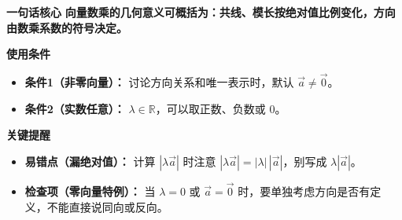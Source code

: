 \begin{summarybox}
	\textbf{\textcolor{CSummary}{一句话核心}}
	\textbf{向量数乘的几何意义可概括为：共线、模长按绝对值比例变化，方向由数乘系数的符号决定。}

	\medskip
	\textbf{\textcolor{CSummary}{使用条件}}
	\begin{itemize}[leftmargin=*, itemsep=0.5em, topsep=0.4em]
		\item \textbf{条件1（非零向量）：} 讨论方向关系和唯一表示时，默认 $\vec{a}\neq\vec{0}$。
		\item \textbf{条件2（实数任意）：} $\lambda\in\mathbb{R}$，可以取正数、负数或 $0$。
	\end{itemize}

	\medskip
	\textbf{\textcolor{CSummary}{关键提醒}}
	\begin{itemize}[leftmargin=*, itemsep=0.5em, topsep=0.4em]
		\item \textbf{易错点（漏绝对值）：} 计算 $|\lambda\vec{a}|$ 时注意 $|\lambda\vec{a}| = |\lambda|\,|\vec{a}|$，别写成 $\lambda|\vec{a}|$。
		\item \textbf{检查项（零向量特例）：} 当 $\lambda=0$ 或 $\vec{a}=\vec{0}$ 时，要单独考虑方向是否有定义，不能直接说同向或反向。
	\end{itemize}
\end{summarybox}